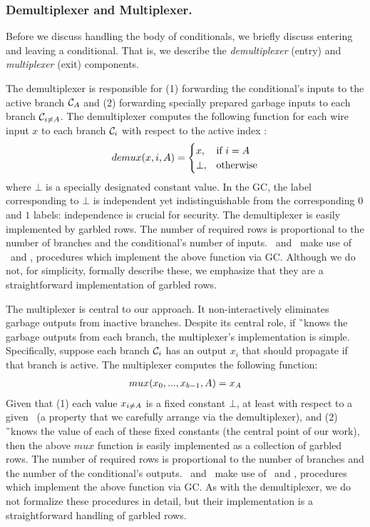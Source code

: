 \subsubsection{Demultiplexer and Multiplexer.}

Before we discuss handling the body of conditionals, we briefly discuss
entering and leaving a conditional.
%
That is, we describe the \emph{demultiplexer} (entry) and
\emph{multiplexer} (exit) components.

The demultiplexer is responsible for (1) forwarding the
conditional's inputs to the active branch $\mathcal C_{A}$ and (2)
forwarding specially prepared garbage inputs to each branch $\mathcal C_{i \neq A}$.
The demultiplexer computes the following function for
each wire input $x$ to each branch $\mathcal C_i$ with respect to the active
index \aid:
\begin{align*}
demux(x, i, A) =
   \begin{cases}
     x,& \text{if $i = A$}\\
     \bot, &\text{otherwise}
   \end{cases}
\end{align*}
where $\bot$ is a specially designated constant value.
In the GC, the label corresponding to $\bot$ is independent yet
indistinguishable from the corresponding $0$ and $1$ labels:
independence is crucial for security.
The demultiplexer is easily implemented by garbled rows.
The number of required rows is proportional to the number of branches
and the conditional's number of inputs.
%
\evcond\ and \gbcond\ make use of \evdem\ and \gbdem, procedures which
implement the above function via GC.
Although we do not, for simplicity, formally describe these, we
emphasize that they are a straightforward implementation of garbled rows.

The multiplexer is central to our approach.
It non-interactively eliminates garbage outputs from inactive
branches.
%
Despite its central role, if \G\ knows the garbage
outputs from each branch, the multiplexer's implementation is simple.
%
Specifically, suppose each branch $\mathcal C_i$ has an output $x_i$ that
should propagate if that branch is active.
The multiplexer computes the following function:
\begin{align*}
  mux(x_0, ..., x_{b-1}, A) = x_{A}
\end{align*}
Given that (1) each value $x_{i\neq A}$ is a fixed constant $\bot$, at
least with respect to a given \aid\ (a
property that we carefully arrange via the demultiplexer), and (2) \G\
knows the value of each of these fixed constants (the central point of
our work), then the above $mux$ function is easily implemented as a
collection of garbled rows.
The number of required rows is proportional to the number of branches
and the number of the conditional's outputs.
\evcond\ and \gbcond\ make use of \evmux\ and \gbmux, procedures which
implement the above function via GC.
As with the demultiplexer, we do not formalize these procedures in
detail, but their implementation is a straightforward handling of
garbled rows.

